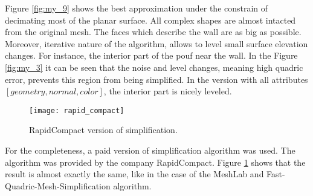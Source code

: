 Figure \ref{fig:my_9} shows the best approximation under the constrain of decimating most of the planar surface. All complex shapes are almost intacted from the original mesh. The faces which describe the wall are as big as possible. Moreover, iterative nature of the algorithm, allows to level small surface elevation changes. For instance, the interior part of the pouf near the wall. In the Figure \ref{fig:my_3} it can be seen that the noise and level changes, meaning high quadric error, prevents this region from being simplified. In the version with all attributes $[geometry, normal, color]$, the interior part is nicely leveled.

\begin{figure}[H]
  \begin{center}
    \texttt{[image: rapid\_compact]}
    \caption{RapidCompact version of simplification.}
    \label{fig:rapid_compact}
  \end{center}
\end{figure}

For the completeness, a paid version of simplification algorithm was used. The algorithm was provided by the company RapidCompact. Figure \ref{fig:rapid_compact} shows that the result is almost exactly the same, like in the case of the MeshLab and Fast-Quadric-Mesh-Simplification algorithm.
